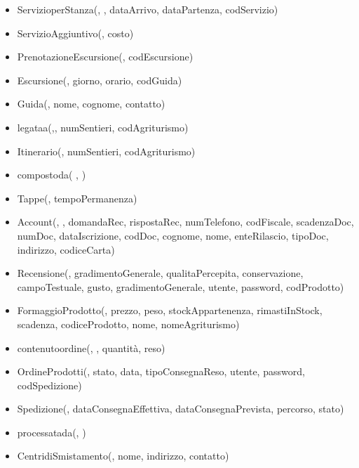 \documentclass[12pt,a4paper]{article}
\begin{document}
\begin{itemize}
\item ServizioperStanza(\underline{}, \underline{},  dataArrivo, dataPartenza,  codServizio)
\item ServizioAggiuntivo(\underline{}, costo)
\item PrenotazioneEscursione(\underline{},  codEscursione)
\item Escursione(\underline{}, giorno, orario,  codGuida)
\item Guida(\underline{}, nome, cognome, contatto)
\item legataa(\underline{},\underline{}, numSentieri,  codAgriturismo)
\item Itinerario(\underline{}, numSentieri, codAgriturismo)
\item compostoda( \underline{},  \underline{})
\item Tappe(\underline{}, tempoPermanenza) 
\item Account(\underline{}, \underline{}, domandaRec, rispostaRec, numTelefono, codFiscale, scadenzaDoc, numDoc, dataIscrizione, codDoc, cognome, nome, enteRilascio, tipoDoc, indirizzo, codiceCarta)
\item Recensione(\underline{}, gradimentoGenerale, qualitaPercepita, conservazione, campoTestuale, gusto, gradimentoGenerale,  utente,  password,  codProdotto)
\item FormaggioProdotto(\underline{}, prezzo, peso, stockAppartenenza, rimastiInStock, scadenza,  codiceProdotto,  nome,  nomeAgriturismo)
\item contenutoordine(\underline{}, \underline{}, quantità, reso)
\item OrdineProdotti(\underline{}, stato, data, tipoConsegnaReso,  utente,  password,  codSpedizione)
\item Spedizione(\underline{}, dataConsegnaEffettiva, dataConsegnaPrevista, percorso, stato)
\item processatada(\underline{}, \underline{})
\item CentridiSmistamento(\underline{}, nome, indirizzo, contatto)

\end{itemize}
\end{document}
